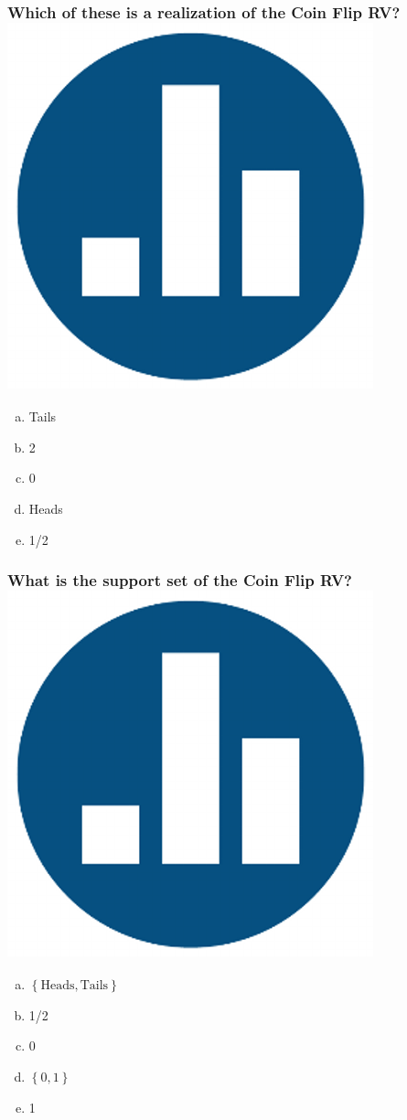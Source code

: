 \begin{frame}
  \frametitle{Which of these is a realization of the Coin Flip RV?\hfill\includegraphics[scale = 0.05]{./images/clicker}}
  \begin{enumerate}[(a)]
    \item Tails
    \item 2
    \item 0 
    \item Heads
    \item 1/2
  \end{enumerate}
\end{frame}
\begin{frame}
  \frametitle{What is the support set of the Coin Flip RV?\hfill\includegraphics[scale = 0.05]{./images/clicker}}
  \begin{enumerate}[(a)]
    \item $\left\{ \mbox{Heads}, \mbox{Tails} \right\}$ 
    \item 1/2 
    \item 0 
    \item $\left\{ 0,1 \right\}$
    \item 1
  \end{enumerate}
\end{frame}
